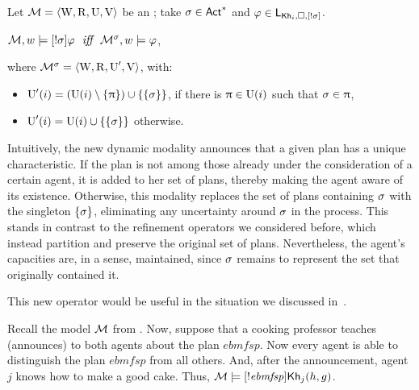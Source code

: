 \begin{definition}\label{def:srefsemantics}
Let $\mathcal{M} = \langle \operatorname{W}, \operatorname{R}, \operatorname{U}, \operatorname{V} \rangle$ be an \ults; take $\sigma \in {\rm \sf Act}^*$ and $\varphi \in \mathsf{L}_{{\sf Kh}_i,\square,[!\sigma]}$.
\begin{spcenter}
$\mathcal{M},w \models [!\sigma]\varphi \ \ \mbox{\it iff} \ \ \mathcal{M}^\sigma,w \models \varphi$,
\end{spcenter}
where $\mathcal{M}^\sigma = \langle \operatorname{W},\operatorname{R},\operatorname{U}',\operatorname{V} \rangle$, with:
\begin{itemize}
\item $\operatorname{U}'(i) = (\operatorname{U}(i) \setminus \{ \uppi \}) \cup \{ \{ \sigma \} \}$, if there is $\uppi \in \operatorname{U}(i)$ such that $\sigma \in \uppi$,
\item $\operatorname{U}'(i) = \operatorname{U}(i) \cup \{ \{ \sigma \} \}$ otherwise.

\end{itemize}
\end{definition}

\medskip

Intuitively, the new dynamic modality announces that a given plan has a unique characteristic. If the plan is not among those already under the consideration of a certain agent, it is added to her set of plans, thereby making the agent aware of its existence.
Otherwise, this modality replaces the set of plans containing $\sigma$ with the singleton
$\{\sigma\}$, eliminating any uncertainty around $\sigma$ in the process. This stands in contrast to the refinement operators we considered before, which instead partition and preserve the original set of plans. Nevertheless, the agent’s capacities are, in a sense, maintained, since $\sigma$ remains to represent the set that originally contained it.

\medskip

This new operator would be useful in the situation we discussed in~.

\medskip 

\begin{example}\label{ex:sref}
Recall the model $\mathcal{M}$ from .
Now, suppose that a cooking professor teaches (announces) to both agents about the plan $\mathit{ebmfsp}$.
Now every agent is able to distinguish the plan $\mathit{ebmfsp}$ from all others.
And, after the announcement, agent~$j$ knows how to make a good cake.
Thus, $\mathcal{M} \models [!\mathit{ebmfsp}] {\sf Kh}_j(h,g)$.
\end{example}

